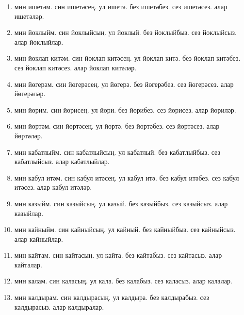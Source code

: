 \documentclass{article}
\begin{document}
\begin{enumerate}
    \item
    мин ишетәм.
    син ишетәсең.
    ул ишетә.
    без ишетәбез.
    сез ишетәсез.
    алар ишетәләр.

    \item
    мин йоклыйм.
    син йоклыйсың.
    ул йоклый.
    без йоклыйбыз.
    сез йоклыйсыз.
    алар йоклыйлар.

    \item
    мин йоклап китәм.
    син йоклап китәсең.
    ул йоклап китә.
    без йоклап китәбез.
    сез йоклап китәсез.
    алар йоклап китәләр.

    \item
    мин йөгерәм.
    син йөгерәсең.
    ул йөгерә.
    без йөгерәбез.
    сез йөгерәсез.
    алар йөгерәләр.

    \item
    мин йөрим.
    син йөрисең.
    ул йөри.
    без йөрибез.
    сез йөрисез.
    алар йөриләр.

    \item
    мин йөртәм.
    син йөртәсең.
    ул йөртә.
    без йөртәбез.
    сез йөртәсез.
    алар йөртәләр.

    \item
    мин кабатлыйм.
    син кабатлыйсың.
    ул кабатлый.
    без кабатлыйбыз.
    сез кабатлыйсыз.
    алар кабатлыйлар.

    \item
    мин кабул итәм.
    син кабул итәсең.
    ул кабул итә.
    без кабул итәбез.
    сез кабул итәсез.
    алар кабул итәләр.

    \item
    мин казыйм.
    син казыйсың.
    ул казый.
    без казыйбыз.
    сез казыйсыз.
    алар казыйлар.

    \item
    мин кайныйм.
    син кайныйсың.
    ул кайный.
    без кайныйбыз.
    сез кайныйсыз.
    алар кайныйлар.

    \item
    мин кайтам.
    син кайтасың.
    ул кайта.
    без кайтабыз.
    сез кайтасыз.
    алар кайталар.

    \item
    мин калам.
    син каласың.
    ул кала.
    без калабыз.
    сез каласыз.
    алар калалар.

    \item
    мин калдырам.
    син калдырасың.
    ул калдыра.
    без калдырабыз.
    сез калдырасыз.
    алар калдыралар.


\end{enumerate}
\end{document}
